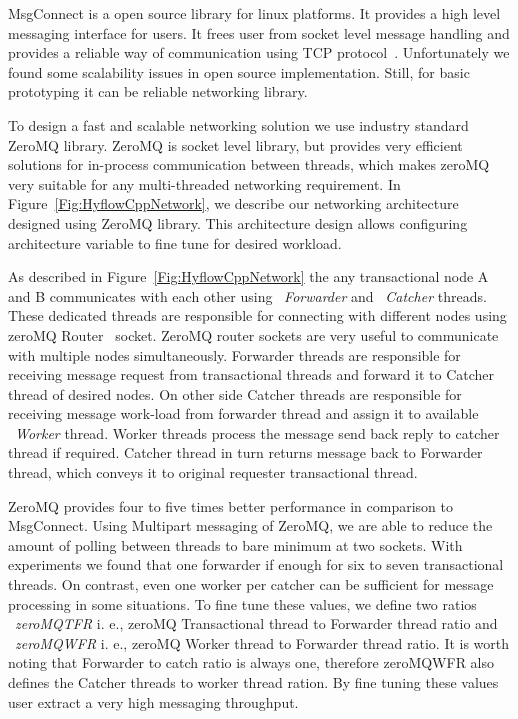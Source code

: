 \documentclass[12pt,english]{report}
\begin{document}
MsgConnect is a open source library for linux platforms. It provides a high level messaging interface for users. It frees user from socket level message handling and provides a reliable way of communication using TCP protocol~\cite{forouzan2002tcp}. Unfortunately we found some scalability issues in open source implementation. Still, for basic prototyping it can be reliable networking library.

To design a fast and scalable networking solution we use industry standard ZeroMQ library. ZeroMQ is socket level library, but provides very efficient solutions for in-process communication between threads, which makes zeroMQ very suitable for any multi-threaded networking requirement. In Figure~\ref{Fig:HyflowCppNetwork}, we describe our networking architecture designed using ZeroMQ library. This architecture design allows configuring architecture variable to fine tune for desired workload. 

As described in Figure~\ref{Fig:HyflowCppNetwork} the any transactional node A and B communicates with each other using ~\emph{Forwarder} and ~\emph{Catcher} threads. These dedicated threads are responsible for connecting with different nodes using zeroMQ Router~\cite{hintjens2011omq} socket. ZeroMQ router sockets are very useful to communicate with multiple nodes simultaneously. Forwarder threads are responsible for receiving message request from transactional threads and forward it to Catcher thread of desired nodes. On other side Catcher threads are responsible for receiving message work-load from forwarder thread and assign it to available ~\emph{Worker} thread. Worker threads process the message send back reply to catcher thread if required. Catcher thread in turn returns message back to Forwarder thread, which conveys it to original requester transactional thread.

ZeroMQ provides four to five times better performance in comparison to MsgConnect. Using Multipart messaging of ZeroMQ, we are able to reduce the amount of polling between threads to bare minimum at two sockets. With experiments we found that one forwarder if enough for six to seven transactional threads. On contrast, even one worker per catcher can be sufficient for message processing in some situations. To fine tune these values, we define two ratios ~\emph{zeroMQTFR} i. e., zeroMQ Transactional thread to Forwarder thread ratio and ~\emph{zeroMQWFR} i. e., zeroMQ Worker thread to Forwarder thread ratio. It is worth noting that Forwarder to catch ratio is always one, therefore zeroMQWFR also defines the Catcher threads to worker thread ration. By fine tuning these values user extract a very high messaging throughput.
\end{document}
